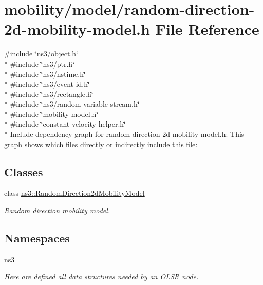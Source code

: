 \hypertarget{random-direction-2d-mobility-model_8h}{}\section{mobility/model/random-\/direction-\/2d-\/mobility-\/model.h File Reference}
\label{random-direction-2d-mobility-model_8h}
{\ttfamily \#include \char`\"{}ns3/object.\+h\char`\"{}}\\*
{\ttfamily \#include \char`\"{}ns3/ptr.\+h\char`\"{}}\\*
{\ttfamily \#include \char`\"{}ns3/nstime.\+h\char`\"{}}\\*
{\ttfamily \#include \char`\"{}ns3/event-\/id.\+h\char`\"{}}\\*
{\ttfamily \#include \char`\"{}ns3/rectangle.\+h\char`\"{}}\\*
{\ttfamily \#include \char`\"{}ns3/random-\/variable-\/stream.\+h\char`\"{}}\\*
{\ttfamily \#include \char`\"{}mobility-\/model.\+h\char`\"{}}\\*
{\ttfamily \#include \char`\"{}constant-\/velocity-\/helper.\+h\char`\"{}}\\*
Include dependency graph for random-\/direction-\/2d-\/mobility-\/model.h\+:
This graph shows which files directly or indirectly include this file\+:
\subsection*{Classes}
\begin{DoxyCompactItemize}
\item 
class \hyperlink{classns3_1_1RandomDirection2dMobilityModel}{ns3\+::\+Random\+Direction2d\+Mobility\+Model}
\begin{DoxyCompactList}\small\item\em Random direction mobility model. \end{DoxyCompactList}\end{DoxyCompactItemize}
\subsection*{Namespaces}
\begin{DoxyCompactItemize}
\item 
 \hyperlink{namespacens3}{ns3}
\begin{DoxyCompactList}\small\item\em Here are defined all data structures needed by an O\+L\+SR node. \end{DoxyCompactList}\end{DoxyCompactItemize}
